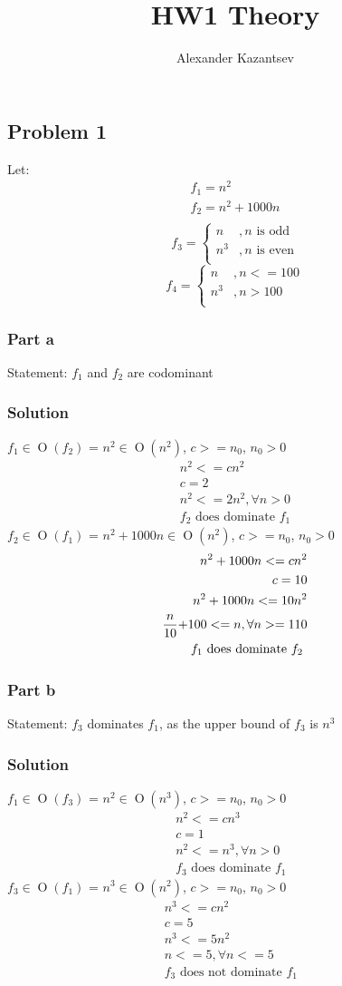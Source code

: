 \documentclass[10pt,letterpaper,oneside]{article}
\title{HW1 Theory}
\author{Alexander Kazantsev}
\newcommand{\Problem}[1]{\subsection*{Problem #1}}
\newcommand{\Part}[1]{\subsubsection*{Part #1}}
\newcommand{\Solution}{\subsubsection*{Solution}}
\DeclareMathOperator{\Omicron}{O}
\newcommand{\BigOh}[1]{\Omicron(#1)}
\begin{document}
\maketitle

\Problem{1}
	
	Let:
	\begin{eqnarray*}
		\text{$f_1 = n^2$}\\
		\text{$f_2 = n^2 + 1000n$}\\
	\end{eqnarray*}
		\[
			f_3= \left\lbrace%
			\begin{array}{cc}
				n &, \text{$n$ is odd}\\
				n^3 &, \text{$n$ is even}\\
			\end{array} \right.
		\]
		\[
			f_4= \left\lbrace%
			\begin{array}{cc}
				n &, n<=100\\
				n^3 &, n>100\\
			\end{array} \right.
		\]

	\Part{a}
	Statement: $f_1$ and $f_2$ are codominant 
	\Solution
		$f_1 \in \BigOh{f_2}$ = $n^2 \in \BigOh{n^2}$,	
		$c >= n_0$,
		$ n_0 > 0$
		\begin{eqnarray*}
			\text{$n^2 <= cn^2$}\\
			\text{$c=2$}\\
			\text{$n^2 <= 2n^2$}, \forall n>0\\
			\text{$f_2$ does dominate $f_1$}
		\end{eqnarray*}
		$f_2 \in \BigOh{f_1}$ = $n^2 + 1000n \in \BigOh{n^2}$,	
		$c >= n_0$,
		$ n_0 > 0$
		\begin{eqnarray*}
			\text{$n^2 + 1000n <= cn^2$}\\
			\text{$c=10$}\\
			\text{$n^2 + 1000n <= 10n^2$}\\
			\frac{n}{10}\text{$ + 100 <= n$}, \forall n >= 110\\
			\text{$f_1$ does dominate $f_2$ }
		\end{eqnarray*}
	\Part{b}
	Statement: $f_3$ dominates $f_1$, as the upper bound of $f_3$ is $n^3$
	\Solution
		$f_1 \in \BigOh{f_3}$ = $n^2 \in \BigOh{n^3}$,	
		$c >= n_0$,
		$ n_0 > 0$
		\begin{eqnarray*}
			\text{$n^2 <= cn^3$}\\
			\text{$c=1$}\\
			\text{$n^2 <= n^3$}, \forall n>0\\
			\text{$f_3$ does dominate $f_1$ }
		\end{eqnarray*}
		$f_3 \in \BigOh{f_1}$ = $n^3 \in \BigOh{n^2}$,
		$c >= n_0$,
		$ n_0 > 0$
		\begin{eqnarray*}
			\text{$n^3 <= cn^2$}\\
			\text{$c=5$}\\
			\text{$n^3 <= 5n^2$}\\
			\text{$n <= 5$}, \forall n<=5\\
			\text{$f_3$ does not dominate $f_1$ }
		\end{eqnarray*}
\end{document}
